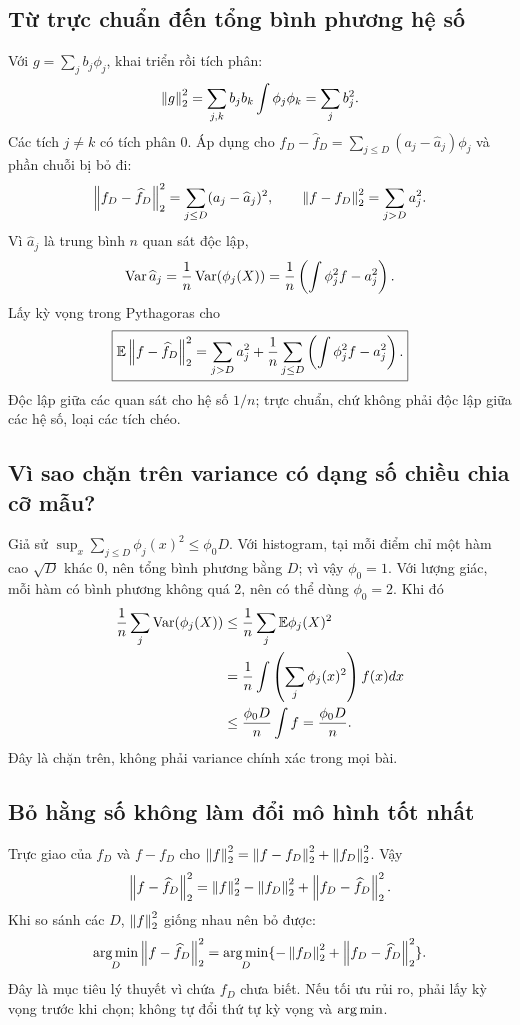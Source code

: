 \subsection{Từ trực chuẩn đến tổng bình phương hệ số}
Với $g=\sum_jb_j\phi_j$, khai triển rồi tích phân:
\[
\left\lVert g\right\rVert_2^2=\sum_{j,k}b_jb_k\int\phi_j\phi_k=\sum_jb_j^2.
\]
Các tích $j\ne k$ có tích phân 0. Áp dụng cho
$f_D-\widehat f_D=\sum_{j\leq D}(a_j-\widehat a_j)\phi_j$ và phần
chuỗi bị bỏ đi:
\[
\left\lVert f_D-\widehat f_D\right\rVert_2^2=\sum_{j\leq D}(a_j-\widehat a_j)^2,
\qquad \left\lVert f-f_D\right\rVert_2^2=\sum_{j>D}a_j^2.
\]
Vì $\widehat a_j$ là trung bình $n$ quan sát độc lập,
\[
\operatorname{Var}\widehat a_j=\frac1n\operatorname{Var}(\phi_j(X))
=\frac1n\left(\int\phi_j^2f-a_j^2\right).
\]
Lấy kỳ vọng trong Pythagoras cho
\[
\boxed{\mathbb E\left\lVert f-\widehat f_D\right\rVert_2^2=
\sum_{j>D}a_j^2+\frac1n\sum_{j\leq D}\left(\int\phi_j^2f-a_j^2\right).}
\]
Độc lập giữa các quan sát cho hệ số $1/n$; trực chuẩn, chứ không phải
độc lập giữa các hệ số, loại các tích chéo.

\subsection{Vì sao chặn trên variance có dạng số chiều chia cỡ mẫu?}
Giả sử $\sup_x\sum_{j\leq D}\phi_j(x)^2\leq\phi_0D$.
Với histogram, tại mỗi điểm chỉ một hàm cao $\sqrt D$ khác 0, nên tổng
bình phương bằng $D$; vì vậy $\phi_0=1$.
Với lượng giác, mỗi hàm có bình phương không quá 2, nên có thể dùng
$\phi_0=2$. Khi đó
\begin{align*}
\frac1n\sum_j\operatorname{Var}(\phi_j(X))
&\leq\frac1n\sum_j\mathbb E\phi_j(X)^2\\
&=\frac1n\int\left(\sum_j\phi_j(x)^2\right)f(x)dx\\
&\leq\frac{\phi_0D}{n}\int f=\frac{\phi_0D}{n}.
\end{align*}
Đây là chặn trên, không phải variance chính xác trong mọi bài.

\subsection{Bỏ hằng số không làm đổi mô hình tốt nhất}
Trực giao của $f_D$ và $f-f_D$ cho
$\left\lVert f\right\rVert_2^2=\left\lVert f-f_D\right\rVert_2^2+\left\lVert f_D\right\rVert_2^2$.
Vậy
\[
\left\lVert f-\widehat f_D\right\rVert_2^2=
\left\lVert f\right\rVert_2^2-\left\lVert f_D\right\rVert_2^2+\left\lVert f_D-\widehat f_D\right\rVert_2^2.
\]
Khi so sánh các $D$, $\left\lVert f\right\rVert_2^2$ giống nhau nên bỏ được:
\[
\operatorname*{arg\,min}_D\left\lVert f-\widehat f_D\right\rVert_2^2
=\operatorname*{arg\,min}_D\{-\left\lVert f_D\right\rVert_2^2+\left\lVert f_D-\widehat f_D\right\rVert_2^2\}.
\]
Đây là mục tiêu lý thuyết vì chứa $f_D$ chưa biết. Nếu tối ưu rủi ro,
phải lấy kỳ vọng trước khi chọn; không tự đổi thứ tự kỳ vọng và
$\operatorname*{arg\,min}$.

